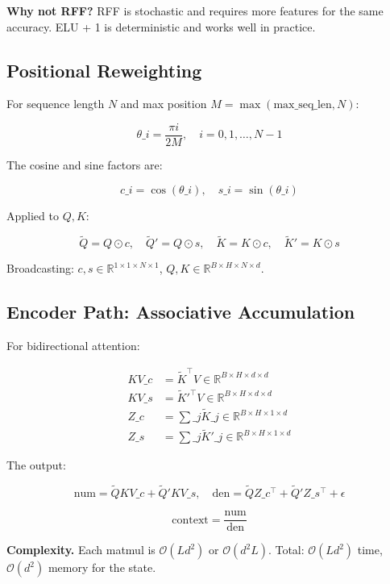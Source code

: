 \textbf{Why not RFF?} RFF is stochastic and requires more features for the same 
accuracy. ELU + 1 is deterministic and works well in practice.

\subsection{Positional Reweighting}

For sequence length $N$ and max position $M = \max(\text{max\_seq\_len}, N)$:

\[
\theta\_i = \frac{\pi i}{2 M}, \quad i = 0, 1, \dots, N-1
\]

The cosine and sine factors are:

\[
c\_i = \cos(\theta\_i), \quad s\_i = \sin(\theta\_i)
\]

Applied to $Q, K$:

\[
\tilde{Q} = Q \odot c, \quad \tilde{Q}' = Q \odot s, \quad
\tilde{K} = K \odot c, \quad \tilde{K}' = K \odot s
\]

Broadcasting: $c, s \in \mathbb{R}^{1 \times 1 \times N \times 1}$, 
$Q, K \in \mathbb{R}^{B \times H \times N \times d}$.

\subsection{Encoder Path: Associative Accumulation}

For bidirectional attention:

\[
\begin{aligned}
KV\_c &= \tilde{K}^\top V \in \mathbb{R}^{B \times H \times d \times d} \\
KV\_s &= \tilde{K}'^\top V \in \mathbb{R}^{B \times H \times d \times d} \\
Z\_c &= \sum\_j \tilde{K}\_j \in \mathbb{R}^{B \times H \times 1 \times d} \\
Z\_s &= \sum\_j \tilde{K}'\_j \in \mathbb{R}^{B \times H \times 1 \times d}
\end{aligned}
\]

The output:

\[
\text{num} = \tilde{Q} KV\_c + \tilde{Q}' KV\_s, \quad
\text{den} = \tilde{Q} Z\_c^\top + \tilde{Q}' Z\_s^\top + \epsilon
\]

\[
\text{context} = \frac{\text{num}}{\text{den}}
\]

\textbf{Complexity.} Each matmul is $\mathcal{O}(L d^2)$ or $\mathcal{O}(d^2 L)$. 
Total: $\mathcal{O}(L d^2)$ time, $\mathcal{O}(d^2)$ memory for the state.

